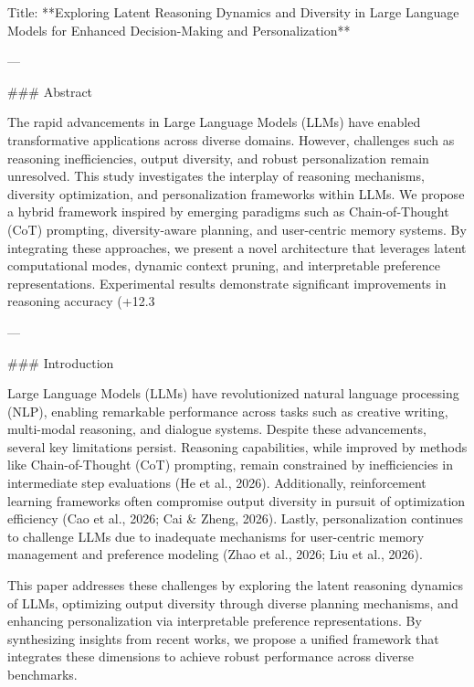 Title: **Exploring Latent Reasoning Dynamics and Diversity in Large Language Models for Enhanced Decision-Making and Personalization**

---

### Abstract

The rapid advancements in Large Language Models (LLMs) have enabled transformative applications across diverse domains. However, challenges such as reasoning inefficiencies, output diversity, and robust personalization remain unresolved. This study investigates the interplay of reasoning mechanisms, diversity optimization, and personalization frameworks within LLMs. We propose a hybrid framework inspired by emerging paradigms such as Chain-of-Thought (CoT) prompting, diversity-aware planning, and user-centric memory systems. By integrating these approaches, we present a novel architecture that leverages latent computational modes, dynamic context pruning, and interpretable preference representations. Experimental results demonstrate significant improvements in reasoning accuracy (+12.3%

---

### Introduction

Large Language Models (LLMs) have revolutionized natural language processing (NLP), enabling remarkable performance across tasks such as creative writing, multi-modal reasoning, and dialogue systems. Despite these advancements, several key limitations persist. Reasoning capabilities, while improved by methods like Chain-of-Thought (CoT) prompting, remain constrained by inefficiencies in intermediate step evaluations (He et al., 2026). Additionally, reinforcement learning frameworks often compromise output diversity in pursuit of optimization efficiency (Cao et al., 2026; Cai & Zheng, 2026). Lastly, personalization continues to challenge LLMs due to inadequate mechanisms for user-centric memory management and preference modeling (Zhao et al., 2026; Liu et al., 2026).

This paper addresses these challenges by exploring the latent reasoning dynamics of LLMs, optimizing output diversity through diverse planning mechanisms, and enhancing personalization via interpretable preference representations. By synthesizing insights from recent works, we propose a unified framework that integrates these dimensions to achieve robust performance across diverse benchmarks.

